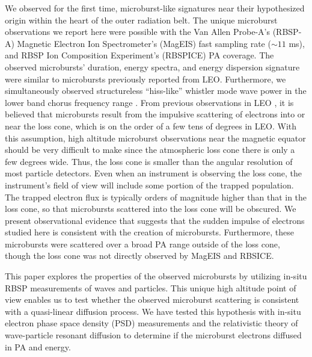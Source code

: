 We observed for the first time, microburst-like signatures near their hypothesized origin within the heart of the outer radiation belt. The unique microburst observations we report here were possible with the Van Allen Probe-A's (RBSP-A) Magnetic Electron Ion Spectrometer's (MagEIS) fast sampling rate (${\sim} 11$ ms), and RBSP Ion Composition Experiment's (RBSPICE) PA coverage. The observed microbursts' duration, energy spectra, and energy dispersion signature were similar to microbursts previously reported from LEO. Furthermore, we simultaneously observed structureless ``hiss-like'' whistler mode wave power in the lower band chorus frequency range \citep{Li2012}. From previous observations in LEO \citep[e.g.][]{Blake1996}, it is believed that microbursts result from the impulsive scattering of electrons into or near the loss cone, which is on the order of a few tens of degrees in LEO. With this assumption, high altitude microburst observations near the magnetic equator should be very difficult to make since the atmospheric loss cone there is only a few degrees wide. Thus, the loss cone is smaller than the angular resolution of most particle detectors. Even when an instrument is observing the loss cone, the instrument's field of view will include some portion of the trapped population. The trapped electron flux is typically orders of magnitude higher than that in the loss cone, so that microbursts scattered into the loss cone will be obscured. We present observational evidence that suggests that the sudden impulse of electrons studied here is consistent with the creation of microbursts. Furthermore, these microbursts were scattered over a broad PA range outside of the loss cone, though the loss cone was not directly observed by MagEIS and RBSICE.

This paper explores the properties of the observed microbursts by utilizing in-situ RBSP measurements of waves and particles. This unique high altitude point of view enables us to test whether the observed microburst scattering is consistent with a quasi-linear diffusion process. We have tested this hypothesis with in-situ electron phase space density (PSD) measurements and the relativistic theory of wave-particle resonant diffusion \citep{Walker1993, Summers1998} to determine if the microburst electrons diffused in PA and energy.

